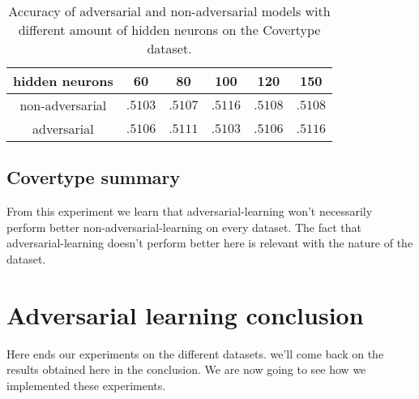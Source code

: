 			\begin{table}[ht]
				\centering
				\begin{tabular}{c||c|c|c|c|c}
					hidden neurons & 60 & 80 & 100 & 120 & 150 \\
					\hline
					non-adversarial & $.5103$ & $.5107$ & $.5116$ & $.5108$ & $.5108$ \\
					adversarial     & $.5106$ & $.5111$ & $.5103$ & $.5106$ & $.5116$ \\
				\end{tabular}
				\caption{Accuracy of adversarial and non-adversarial models with different amount of hidden neurons on the Covertype dataset.}
				\label{tab:cov_acc}
			\end{table}

		\subsection{Covertype summary}
			From this experiment we learn that adversarial-learning won't necessarily perform better non-adversarial-learning on every dataset. The fact that adversarial-learning doesn't perform better here is relevant with the nature of the dataset.



	\section{Adversarial learning conclusion}
	\label{sub:adversarial_learning_conclusion}
		Here ends our experiments on the different datasets. we'll come back on the results obtained here in the conclusion. We are now going to see how we implemented these experiments.
